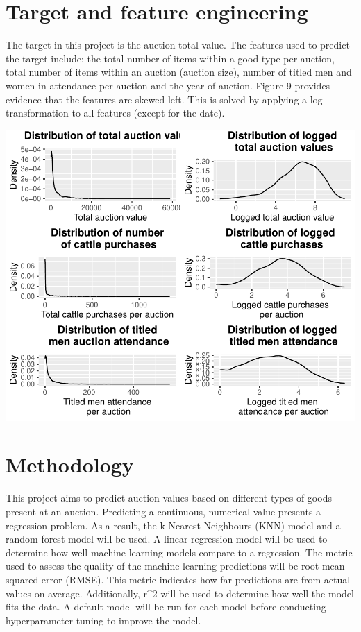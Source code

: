 \documentclass[11pt,preprint, authoryear]{elsarticle}
\numberwithin{equation}{section}
\numberwithin{figure}{section}
\numberwithin{table}{section}
\begin{document}
\hypertarget{target-and-feature-engineering}{%
\section{Target and feature
engineering}\label{target-and-feature-engineering}}

The target in this project is the auction total value. The features used
to predict the target include: the total number of items within a good
type per auction, total number of items within an auction (auction
size), number of titled men and women in attendance per auction and the
year of auction. Figure 9 provides evidence that the features are skewed
left. This is solved by applying a log transformation to all features
(except for the date).

\begin{center}\includegraphics{Project_write_up_files/figure-latex/Figure9-1} \end{center}

\hypertarget{methodology}{%
\section{Methodology}\label{methodology}}

This project aims to predict auction values based on different types of
goods present at an auction. Predicting a continuous, numerical value
presents a regression problem. As a result, the k-Nearest Neighbours
(KNN) model and a random forest model will be used. A linear regression
model will be used to determine how well machine learning models compare
to a regression. The metric used to assess the quality of the machine
learning predictions will be root-mean-squared-error (RMSE). This metric
indicates how far predictions are from actual values on average.
Additionally, r\^{}2 will be used to determine how well the model fits
the data. A default model will be run for each model before conducting
hyperparameter tuning to improve the model.
\end{document}

